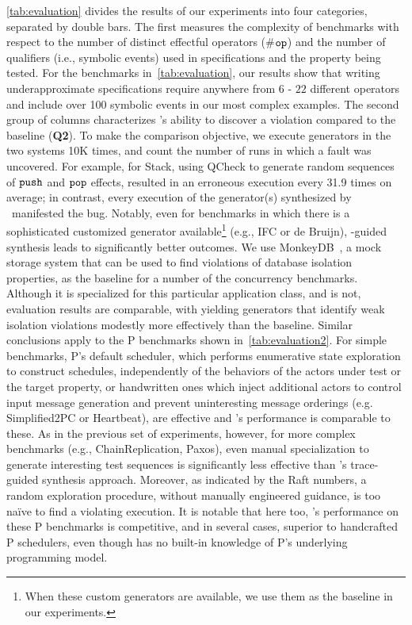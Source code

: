 \autoref{tab:evaluation} divides the results of our experiments into
four categories, separated by double bars. The first measures the
complexity of benchmarks with respect to the number of distinct
effectful operators (\#$\boldsymbol{{\tt op}}$) and the number of qualifiers (i.e.,
symbolic events) used in \tyName{} specifications and the property
being tested.  For the benchmarks in~\autoref{tab:evaluation}, our
results show that writing underapproximate specifications require
anywhere from $6$ - $22$ different operators and include over 100
symbolic events in our most complex examples.  The second group of
columns characterizes \name{}'s ability to discover a violation
compared to the baseline (\textbf{Q2}).  To make the comparison
objective, we execute generators in the two systems 10K times, and
count the number of runs in which a fault was uncovered.  For example,
for \textsf{Stack}, using QCheck to generate random sequences of
$\boldsymbol{{\tt push}}$ and $\boldsymbol{{\tt pop}}$ effects, resulted in an erroneous
execution every 31.9 times on average; in contrast, every execution of
the generator(s) synthesized by \name\ manifested the bug.  Notably,
even for benchmarks in which there is a sophisticated customized
generator available\footnote{When these custom generators are
  available, we use them as the baseline in our experiments.} (e.g.,
\textsf{IFC} or \textsf{de Bruijn}), \tyName{}-guided synthesis leads
to significantly better outcomes.  We use MonkeyDB~\cite{MonkeyDB}, a
mock storage system that can be used to find violations of database
isolation properties, as the baseline for a number of the concurrency
benchmarks.  Although it is specialized for this particular
application class, and \name{} is not, evaluation results are
comparable, with \name{} yielding generators that identify weak
isolation violations modestly more effectively than the baseline.
Similar conclusions apply to the P benchmarks shown
in~\autoref{tab:evaluation2}.  For simple benchmarks, P's default
scheduler, which performs enumerative state exploration to construct
schedules, independently of the behaviors of the actors under test or
the target property, or handwritten ones which inject additional
actors to control input message generation and prevent uninteresting
message orderings (e.g. \textsf{Simplified2PC} or \textsf{Heartbeat}),
are effective and \name{}'s performance is comparable to these.  As in
the previous set of experiments, however, for more complex benchmarks
(e.g., \textsf{ChainReplication}, \textsf{Paxos}), even manual
specialization to generate interesting test sequences is significantly
less effective than \name{}'s trace-guided synthesis approach.
Moreover, as indicated by the \textsf{Raft} numbers, a random
exploration procedure, without manually engineered guidance, is too
na\"{i}ve to find a violating execution.  It is notable that here too,
\name{}'s performance on these P benchmarks is competitive, and in
several cases, superior to handcrafted P schedulers, even though
\name{} has no built-in knowledge of P's underlying programming model.

